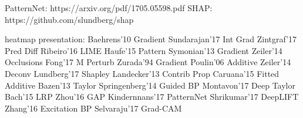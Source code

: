 PatternNet: https://arxiv.org/pdf/1705.05598.pdf
SHAP: https://github.com/slundberg/shap

heatmap presentation:
Baehrens'10 Gradient
Sundarajan'17 Int Grad
Zintgraf'17 Pred Diff
Ribeiro'16 LIME
Haufe'15 Pattern
Symonian'13 Gradient
Zeiler'14 Occlusions
Fong'17 M Perturb
Zurada'94 Gradient
Poulin'06 Additive
Zeiler'14 Deconv
Lundberg'17 Shapley
Landecker'13 Contrib Prop
Caruana'15 Fitted Additive
Bazen'13 Taylor
Springenberg'14 Guided BP
Montavon'17 Deep Taylor
Bach'15 LRP
Zhou'16 GAP
Kindernnans'17 PatternNet
Shrikumar'17 DeepLIFT
Zhang'16 Excitation BP
Selvaraju'17 Grad-CAM
